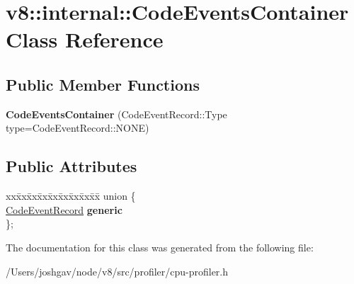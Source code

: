 \hypertarget{classv8_1_1internal_1_1_code_events_container}{}\section{v8\+:\+:internal\+:\+:Code\+Events\+Container Class Reference}
\label{classv8_1_1internal_1_1_code_events_container}
\subsection*{Public Member Functions}
\begin{DoxyCompactItemize}
\item 
{\bfseries Code\+Events\+Container} (Code\+Event\+Record\+::\+Type type=Code\+Event\+Record\+::\+N\+O\+NE)\hypertarget{classv8_1_1internal_1_1_code_events_container_a577663fbea6f921aa1a7054eaf4c98b1}{}\label{classv8_1_1internal_1_1_code_events_container_a577663fbea6f921aa1a7054eaf4c98b1}

\end{DoxyCompactItemize}
\subsection*{Public Attributes}
\begin{DoxyCompactItemize}
\item 
\begin{tabbing}
xx\=xx\=xx\=xx\=xx\=xx\=xx\=xx\=xx\=\kill
union \{\\
\>\hyperlink{classv8_1_1internal_1_1_code_event_record}{CodeEventRecord} {\bfseries generic}\\
\}; \hypertarget{classv8_1_1internal_1_1_code_events_container_a271e37b2f8c2e2b5f6d13799b4f8b948}{}\label{classv8_1_1internal_1_1_code_events_container_a271e37b2f8c2e2b5f6d13799b4f8b948}
\\

\end{tabbing}\end{DoxyCompactItemize}


The documentation for this class was generated from the following file\+:\begin{DoxyCompactItemize}
\item 
/\+Users/joshgav/node/v8/src/profiler/cpu-\/profiler.\+h\end{DoxyCompactItemize}
